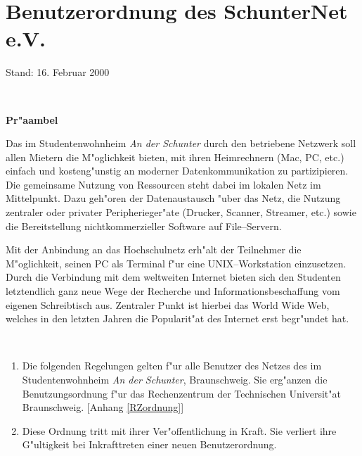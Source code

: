 
\setcounter{para_nr}{0}

\section{Benutzerordnung des SchunterNet e.V.}
\label{nutzerordnung}

{\small Stand: 16. Februar 2000}

\mbox{ }

{\large\sf\textbf{Pr"aambel}}

Das im Studentenwohnheim \emph{An der Schunter} durch den
\snev betriebene Netzwerk soll allen Mietern die
M"oglichkeit bieten, mit ihren Heimrechnern (Mac, PC, etc.) einfach und
kosteng"unstig an moderner Datenkommunikation zu partizipieren. Die
gemeinsame Nutzung von Ressourcen steht dabei im lokalen Netz im
Mittelpunkt. Dazu geh"oren der Datenaustausch "uber das Netz, die
Nutzung zentraler oder privater Peripherieger"ate (Drucker, Scanner,
Streamer, etc.) sowie die Bereitstellung nichtkommerzieller Software
auf File--Servern.

Mit der Anbindung an das Hochschulnetz erh"alt der Teilnehmer die
M"oglichkeit, seinen PC als Terminal f"ur eine UNIX--Workstation
einzusetzen. Durch die Verbindung mit dem weltweiten Internet
bieten sich den Studenten letztendlich ganz neue Wege der Recherche
und Informationsbeschaffung vom eigenen Schreibtisch aus. Zentraler
Punkt ist hierbei das World Wide Web, welches in den letzten Jahren
die Popularit"at des Internet erst begr"undet hat.

\mbox{ }


\begin{enumerate}
  \item Die folgenden Regelungen gelten f"ur alle Benutzer des Netzes
      des \snev im Studentenwohnheim \emph{An der Schunter}, Braunschweig. Sie
      erg"anzen die Benutzungsordnung f"ur das Rechenzentrum der Technischen
      Universit"at Braunschweig. [Anhang \ref{RZordnung}]
  \item Diese Ordnung tritt mit ihrer Ver"offentlichung in Kraft. Sie
      verliert ihre G"ultigkeit bei Inkrafttreten einer neuen Benutzerordnung.
\end{enumerate}


